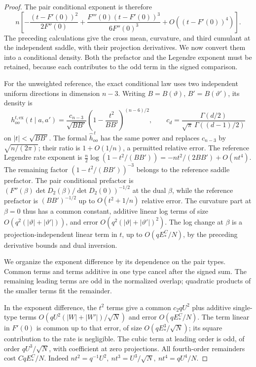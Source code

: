 \begin{proof}
The pair conditional exponent is therefore
\[
 n\left[-\frac{(t-F'(0))^2}{2F''(0)}
   +\frac{F'''(0)(t-F'(0))^3}{6F''(0)^3}+O((t-F'(0))^4)\right].
\]
The preceding calculations give the cross mean, curvature, and third
cumulant at the independent saddle, with their projection derivatives.
We now convert them into a conditional density. Both the prefactor and
the Legendre exponent must be retained, because each contributes to the
odd term in the signed comparison.

For the unweighted reference, the exact conditional law uses two
independent uniform directions in dimension \(n-3\). Writing
\(B=B(\vartheta)\), \(B'=B(\vartheta')\), its density is
\[
 h_{oo}^{t,\mathrm{ex}}(t\mid a,a')
 =\frac{c_{n-3}}{\sqrt{BB'}}
       \left(1-\frac{t^2}{BB'}\right)^{(n-6)/2},
 \qquad
 c_d=\frac{\Gamma(d/2)}{\sqrt\pi\,\Gamma((d-1)/2)}
\]
on \(|t|<\sqrt{BB'}\). The formal \(\widehat h_{oo}^{\,t}\)
has the same power and replaces \(c_{n-3}\) by
\(\sqrt{n/(2\pi)}\); their ratio is \(1+O(1/n)\), a permitted
relative error. The reference Legendre rate exponent is
\(\frac n2\log(1-t^2/(BB'))=-nt^2/(2BB')+O(nt^4)\).
The remaining factor \((1-t^2/(BB'))^{-3}\) belongs to the
reference saddle prefactor. The pair conditional prefactor is
\((F''(\beta)\det D_2(\beta)/\det D_2(0))^{-1/2}\) at the dual
\(\beta\), while the reference prefactor is
\((BB')^{-1/2}\) up to \(O(t^2+1/n)\) relative error.
The curvature part at \(\beta=0\) thus has a common constant,
additive linear log terms of size
\(O(q^2(|\vartheta|+|\vartheta'|))\), and error
\(O(q^2(|\vartheta|+|\vartheta'|)^2)\). The log change at
\(\beta\) is a projection-independent linear term in \(t\),
up to \(O(qE_*^C/N)\), by the preceding derivative bounds and
dual inversion.

We organize the exponent difference by its dependence on the pair
types. Common terms and terms additive in one type cancel after the
signed sum. The remaining leading terms are odd in the normalized
overlap; quadratic products of the smaller terms fit the remainder.

In the exponent difference, the \(t^2\) terms give a common \(c_2 q U^2\) plus additive single-type terms \(O(q U^2 (|W|+|W'|)/\sqrt N)\) and error \(O(q E_*^C/N)\). The term linear in \(F'(0)\) is common up to that error, of size \(O(q E_*^3/\sqrt N)\); its square contribution to the rate is negligible. The cubic term at leading order is odd, of order \(qU^3/\sqrt N\), with coefficient at zero projections. All fourth-order remainders cost \(Cq E_*^C/N\). Indeed \(nt^2=q^{-1}U^2,\ nt^3=U^3/\sqrt N,\ nt^4=q U^4/N\).


\end{proof}
